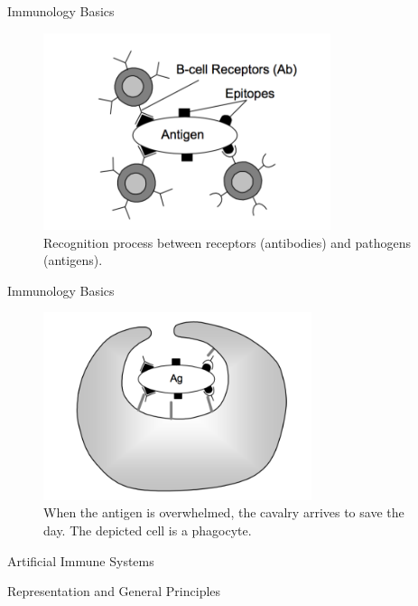 \documentclass[xcolor=svgnames]{beamer}
\newcommand{\introframe}[2]{
    \begin{frame}
	   \vfill
	   \hfill\Huge{#1}
	   
	   \vspace{1em}
	   
	   \hfill\Large{#2}
	   \vfill
    \end{frame}
}
\begin{document}
        \begin{frame}{Immunology Basics}
            \begin{figure}
                \centering
                \includegraphics[width=0.75\textwidth]{fig/recognition}
                \caption{Recognition process between receptors (antibodies) and pathogens (antigens).}
            \end{figure}
        \end{frame}
        
        \begin{frame}{Immunology Basics}
            \begin{figure}
                \centering
                \includegraphics[width=0.7\textwidth]{fig/phagocytosis}
                \caption{When the antigen is overwhelmed, the cavalry arrives to save the day. The depicted cell is a phagocyte.}
            \end{figure}
        \end{frame}
        

    
    
    \introframe{Artificial Immune Systems}{Representation and General Principles}
    
\end{document}
